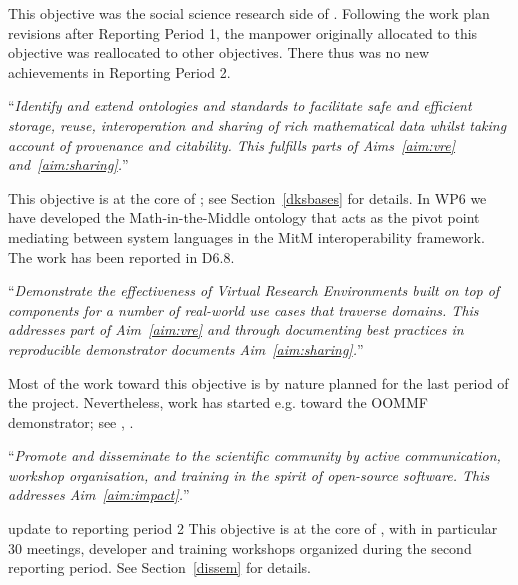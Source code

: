 \begin{compactenum}[\bf O1\rm:]
This objective was the social science research side of
. Following the work plan revisions after
Reporting Period 1, the manpower originally allocated to this
objective was reallocated to other objectives. There thus was no new
achievements in Reporting Period 2.

\item \label{objective:data} ``\emph{Identify and extend ontologies and
  standards to facilitate safe and efficient storage, reuse,
  interoperation and sharing of rich mathematical data whilst taking
  account of provenance and citability. This fulfills parts of
  Aims~\ref{aim:vre} and~\ref{aim:sharing}.}''
 
This objective is at the core of ; see Section~\ref{dksbases} for
details. In WP6 we have developed the Math-in-the-Middle ontology that acts as the pivot
point mediating between system languages in the MitM interoperability framework. The work
has been reported in D6.8.

\item \label{objective:demo} ``\emph{Demonstrate the effectiveness of Virtual
  Research Environments built on top of \ODK components for a
  number of real-world use cases that traverse domains. This addresses
  part of Aim~\ref{aim:vre} and through documenting best practices in
  reproducible demonstrator documents Aim~\ref{aim:sharing}.}''

Most of the work toward this objective is by nature planned for the last period of the \pn
project. Nevertheless, work has started e.g.  toward the OOMMF demonstrator; see
,
.

\item \label{objective:disseminate} ``\emph{Promote and disseminate
  \ODK to the scientific community by active communication,
  workshop organisation, and training in the spirit of open-source
  software. This addresses Aim~\ref{aim:impact}.}''

\begin{oldpart}{update to reporting period 2}
  This objective is at the core of , with in particular
  30 meetings, developer and training workshops organized during the
  second reporting period. See Section~\ref{dissem} for details.
\end{oldpart}
\end{compactenum}



